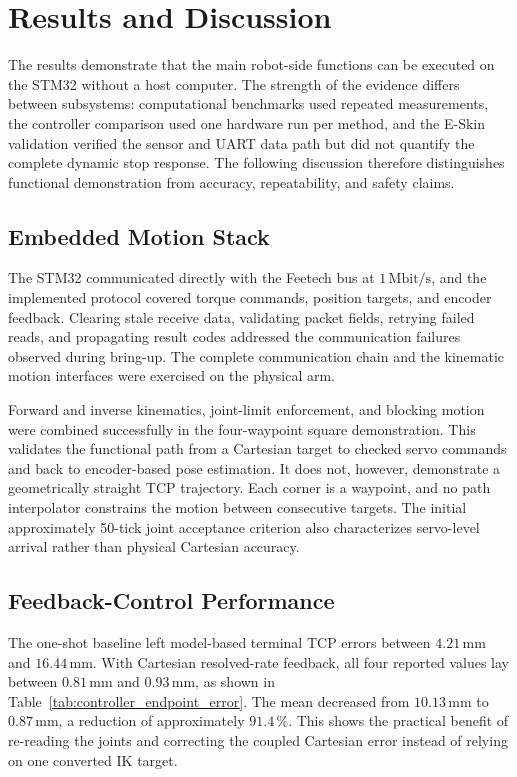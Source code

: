 \section{Results and Discussion}
\label{sec:results_discussion}

The results demonstrate that the main robot-side functions can be executed on
the STM32 without a host computer. The strength of the evidence differs between
subsystems: computational benchmarks used repeated measurements, the controller
comparison used one hardware run per method, and the E-Skin validation verified
the sensor and UART data path but did not quantify the complete dynamic stop
response. The following discussion therefore distinguishes functional
demonstration from accuracy, repeatability, and safety claims.

\subsection{Embedded Motion Stack}

The STM32 communicated directly with the Feetech bus at
\(1\,\mathrm{Mbit/s}\), and the implemented protocol covered torque commands,
position targets, and encoder feedback. Clearing stale receive data, validating
packet fields, retrying failed reads, and propagating result codes addressed the
communication failures observed during bring-up. The complete communication
chain and the kinematic motion interfaces were exercised on the physical arm.

Forward and inverse kinematics, joint-limit enforcement, and blocking motion
were combined successfully in the four-waypoint square demonstration. This
validates the functional path from a Cartesian target to checked servo commands
and back to encoder-based pose estimation. It does not, however, demonstrate a
geometrically straight TCP trajectory. Each corner is a waypoint, and no path
interpolator constrains the motion between consecutive targets. The initial
approximately 50-tick joint acceptance criterion also characterizes servo-level
arrival rather than physical Cartesian accuracy.

\subsection{Feedback-Control Performance}

The one-shot baseline left model-based terminal TCP errors between
\(4.21\,\mathrm{mm}\) and \(16.44\,\mathrm{mm}\). With Cartesian resolved-rate
feedback, all four reported values lay between \(0.81\,\mathrm{mm}\) and
\(0.93\,\mathrm{mm}\), as shown in
Table~\ref{tab:controller_endpoint_error}. The mean decreased from
\(10.13\,\mathrm{mm}\) to \(0.87\,\mathrm{mm}\), a reduction of approximately
\(91.4\,\%\). This shows the practical benefit of re-reading the joints and
correcting the coupled Cartesian error instead of relying on one converted IK
target.

